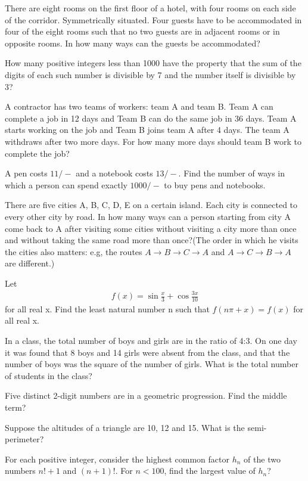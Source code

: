 \item There are eight rooms on the first floor of a hotel, with four rooms on each side of the corridor. Symmetrically situated. Four guests have to be accommodated in four of the eight rooms such that no two guests are in adjacent rooms or in opposite rooms. In how many ways can the guests be accommodated?

\item How many positive integers less than 1000 have the property that the sum of the digits of each such number is divisible by 7 and the number itself is divisible by 3?

\item A contractor has two teams of workers: team A and team B. Team A can complete a job in 12 days and Team B can do the same job in 36 days. Team A starts working on the job and Team B joins team A after 4 days. The team A withdraws after two more days. For how many more days should team B work to complete the job?

\item A pen costs $11/-$ and a notebook costs $13/-$. Find the number of ways in which a person can spend exactly $1000/-$ to buy pens and notebooks.

\item There are five cities A, B, C, D, E on a certain island. Each city is connected to every other city by road. In how many ways can a person starting from city A come back to A after visiting some cities without visiting a city more than once and without taking the same road more than once?(The order in which he visits the cities also matters: e.g, the routes $A \to B \to C \to A$ and $A \to C \to B \to A$ are different.)

\item Let 
\begin{align*}
f(x) = \sin \frac{x}{3} + \cos \frac{3x}{10}
\end{align*}
for all real x. Find the least natural number n such that $f(n\pi + x) = f(x)$ for all real x.

\item In a class, the total number of boys and girls are in the ratio of 4:3. On one day it was found that 8 boys and 14 girls were absent from the class, and that the number of boys was the square of the number of girls. What is the total number of students in the class?

\item Five distinct 2-digit numbers are in a geometric progression. Find the middle term?

\item Suppose the altitudes of a triangle are 10, 12 and 15. What is the semi-perimeter?

\item For each positive integer, consider the highest common factor $h_n$ of the two numbers $n! + 1$ and $(n + 1)!$. For 
$n < 100$, find the largest value of $h_n$? 